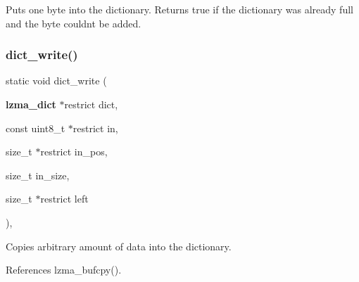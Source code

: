 Puts one byte into the dictionary. Returns true if the dictionary was already full and the byte couldn\textquotesingle{}t be added. \mbox{\label{lz__decoder_8h_ae4695051f81069a5b17c5cb88912e545}} 
\subsubsection{dict\+\_\+write()}
{\footnotesize\ttfamily static void dict\+\_\+write (\begin{DoxyParamCaption}\item[{\textbf{ lzma\+\_\+dict} $\ast$restrict}]{dict,  }\item[{const uint8\+\_\+t $\ast$restrict}]{in,  }\item[{size\+\_\+t $\ast$restrict}]{in\+\_\+pos,  }\item[{size\+\_\+t}]{in\+\_\+size,  }\item[{size\+\_\+t $\ast$restrict}]{left }\end{DoxyParamCaption})\hspace{0.3cm}{\ttfamily [inline]}, {\ttfamily [static]}}



Copies arbitrary amount of data into the dictionary. 



References lzma\+\_\+bufcpy().

